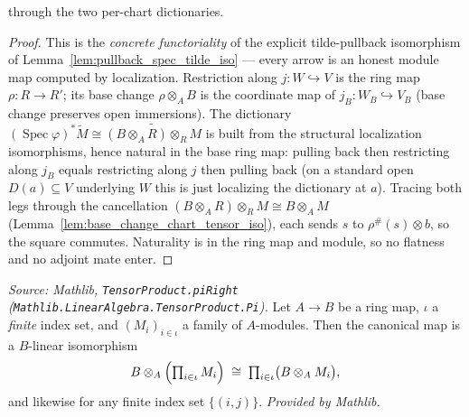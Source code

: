 \begin{lemma}
  through the two per-chart dictionaries.
  \begin{proof}
    This is the \emph{concrete functoriality} of the explicit tilde-pullback isomorphism of
    Lemma~\ref{lem:pullback_spec_tilde_iso} — every arrow is an honest module map computed by
    localization. Restriction along
    \(j : W\hookrightarrow V\) is the ring map \(\rho : R\to R'\); its base change
    \(\rho\otimes_A B\) is the coordinate map of \(j_B : W_B\hookrightarrow V_B\) (base change
    preserves open immersions). The dictionary \((\operatorname{Spec}\varphi)^{*}\widetilde M
    \cong\widetilde{(B\otimes_A R)\otimes_R M}\) is built from the structural localization
    isomorphisms, hence natural in the base ring map: pulling back then restricting along
    \(j_B\) equals restricting along \(j\) then pulling back (on a standard open
    \(D(a)\subseteq V\) underlying \(W\) this is just localizing the dictionary at \(a\)).
    Tracing both legs through the cancellation
    \((B\otimes_A R)\otimes_R M\cong B\otimes_A M\)
    (Lemma~\ref{lem:base_change_chart_tensor_iso}), each sends \(s\) to
    \(\rho^{\#}(s)\otimes b\), so the square commutes. Naturality is in the ring map and
    module, so no flatness and no adjoint mate enter.
  \end{proof}
\end{lemma}

\begin{lemma}
  \label{lem:tensor_finite_product_comm}
  \mathlibok
  \textit{Source: Mathlib, \texttt{TensorProduct.piRight}
  (\texttt{Mathlib.LinearAlgebra.TensorProduct.Pi}).}
  Let \(A \to B\) be a ring map, \(\iota\) a \emph{finite} index set, and \((M_i)_{i\in\iota}\)
  a family of \(A\)-modules. Then the canonical map is a \(B\)-linear isomorphism
  \[
    B \otimes_A \Bigl(\textstyle\prod_{i\in\iota} M_i\Bigr)
    \;\cong\;
    \textstyle\prod_{i\in\iota}\bigl(B \otimes_A M_i\bigr),
  \]
  and likewise for any finite index set \(\{(i,j)\}\). \textit{Provided by Mathlib.}
\end{lemma}


